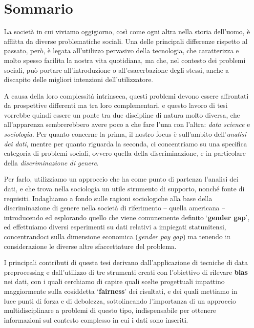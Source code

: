 \newpage
\chapter*{Sommario}


La societ\`a in cui viviamo oggigiorno, cos\`i come ogni altra nella storia dell'uomo, \`e afflitta da diverse problematiche sociali. Una delle principali differenze rispetto al passato, per\`o, \`e legata all'utilizzo pervasivo della tecnologia, che caratterizza e molto spesso facilita la nostra vita quotidiana, ma che, nel contesto dei problemi sociali, pu\`o portare all'introduzione o all'esacerbazione degli stessi, anche a discapito delle migliori intenzioni dell'utilizzatore.

A causa della loro complessit\`a intrinseca, questi problemi devono essere affrontati da prospettive differenti ma tra loro complementari, e questo lavoro di tesi vorrebbe quindi essere un ponte tra due discipline di natura molto diversa, che all'apparenza sembrerebbero avere poco a che fare l'una con l'altra: \textit{data science} e \textit{sociologia}. Per quanto concerne la prima, il nostro focus \`e sull'ambito dell'\textit{analisi dei dati}, mentre per quanto riguarda la seconda, ci concentriamo su una specifica categoria di problemi sociali, ovvero quella della discriminazione, e in particolare della \textit{discriminazione di genere}.

Per farlo, utilizziamo un approccio che ha come punto di partenza l'analisi dei dati, e che trova nella sociologia un utile strumento di supporto, nonch\'e fonte di requisiti. Indaghiamo a fondo sulle ragioni sociologiche alla base della discriminazione di genere nella societ\`a di riferimento -- quella americana -- introducendo ed esplorando quello che viene comunemente definito `\textbf{gender gap}', ed effettuiamo diversi esperimenti su dati relativi a impiegati statunitensi, concentrandoci sulla dimensione economica (\textit{gender pay gap}) ma tenendo in considerazione le diverse altre sfaccettature del problema.

I principali contributi di questa tesi derivano dall'applicazione di tecniche di data preprocessing e dall'utilizzo di tre strumenti creati con l'obiettivo di rilevare \textbf{bias} nei dati, con i quali cerchiamo di capire quali scelte progettuali impattino maggiormente sulla cosiddetta `\textbf{fairness}' dei risultati, e dei quali mettiamo in luce punti di forza e di debolezza, sottolineando l'importanza di un approccio multidisciplinare a problemi di questo tipo, indispensabile per ottenere informazioni sul contesto complesso in cui i dati sono inseriti.
